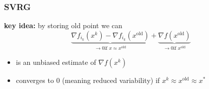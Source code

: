\documentclass{beamer}
\begin{document}
\begin{frame}
  \frametitle{SVRG}
  \textbf{key idea:} by storing old point we can
  \begin{equation}
    \underbrace{\nabla f_{i_k}(x^k) - \nabla f_{i_k}(x^{\text{old}})}_{\to 0 \text{if $x\approx x^{\text{old}}$}} + \underbrace{\nabla f(x^{\text{old}})}_{\to 0 \text{if $x^{\text{old}}$}}
  \end{equation}
  \begin{itemize}
    \item is an unbiased estimate of $\nabla f(x^k)$
    \item converges to $0$ (meaning reduced variability) if $x^k\approx x^{\text{old}} \approx x^*$
  \end{itemize}

\end{frame}

\end{document}
